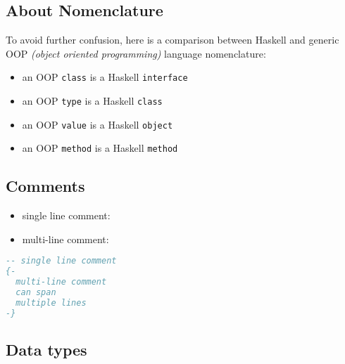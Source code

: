 \documentclass[a4paper,landscape,10pt]{article}
\begin{document}
\begin{multicols*}{2}

  \subsection{About Nomenclature}

  To avoid further confusion, here is a comparison between Haskell and generic OOP \textit{(object oriented programming)} language nomenclature:

  \begin{itemize}
    \item an OOP \texttt{class} is a Haskell \texttt{interface}
    \item an OOP \texttt{type} is a Haskell \texttt{class}
    \item an OOP \texttt{value} is a Haskell \texttt{object}
    \item an OOP \texttt{method} is a Haskell \texttt{method}
  \end{itemize}

  \subsection{Comments}

  \begin{itemize}
    \item single line comment: \ihaskell{--}
    \item multi-line comment: 

  \end{itemize}

  \begin{lstlisting}[language=Haskell]
-- single line comment
{-
  multi-line comment
  can span
  multiple lines
-}
\end{lstlisting}

  \subsection{Data types}


\end{multicols*}
\end{document}
